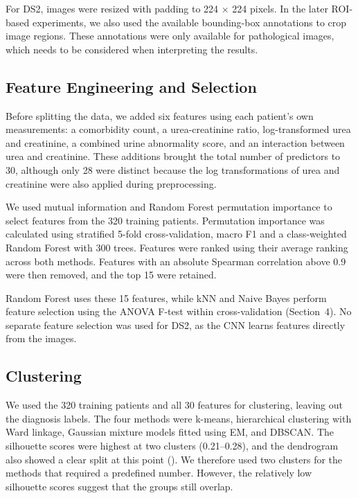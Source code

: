 For DS2, images were resized with padding to 224 $\times$ 224 pixels. In the later ROI-based experiments, we also used the available bounding-box annotations to crop image regions. These annotations were only available for pathological images, which needs to be considered when interpreting the results.

\subsection{Feature Engineering and Selection}

Before splitting the data, we added six features using each patient's own measurements: a comorbidity count, a urea-creatinine ratio, log-transformed urea and creatinine, a combined urine abnormality score, and an interaction between urea and creatinine. These additions brought the total number of predictors to 30, although only 28 were distinct because the log transformations of urea and creatinine were also applied during preprocessing.

We used mutual information and Random Forest permutation importance to select features from the 320 training patients. Permutation importance was calculated using stratified 5-fold cross-validation, macro F1 and a class-weighted Random Forest with 300 trees. Features were ranked using their average ranking across both methods. Features with an absolute Spearman correlation above 0.9 were then removed, and the top 15 were retained.

Random Forest uses these 15 features, while kNN and Naive Bayes perform feature selection using the ANOVA F-test within cross-validation (Section~4). No separate feature selection was used for DS2, as the CNN learns features directly from the images.

\subsection{Clustering}

We used the 320 training patients and all 30 features for clustering, leaving out the diagnosis labels. The four methods were k-means,\cite{macqueen1967} hierarchical clustering with Ward linkage,\cite{ward1963} Gaussian mixture models fitted using EM,\cite{dempster1977} and DBSCAN.\cite{ester1996} The silhouette scores were highest at two clusters (0.21--0.28), and the dendrogram also showed a clear split at this point (). We therefore used two clusters for the methods that required a predefined number. However, the relatively low silhouette scores suggest that the groups still overlap.

